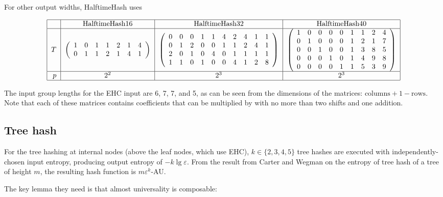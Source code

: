 \documentclass{llncs}
\begin{document}
For other output widths, HalftimeHash uses

\[
\begin{tabular}{|r|c|c|c|}
  \hline  & HalftimeHash16 & HalftimeHash32 & HalftimeHash40 \\
  \hline $T$ &
$\left(
\begin{array}{rrrrrrrrrrrr}
  1 & 0 & 1 & 1 & 2 & 1 & 4\\
  0 & 1 & 1 & 2 & 1 & 4 & 1
\end{array}
\right)$
&
$\left(
\begin{array}{rrrrrrrrrr}
 0 & 0 & 0 & 1 & 1 & 4 & 2 & 4 & 1 & 1 \\
 0 & 1 & 2 & 0 & 0 & 1 & 1 & 2 & 4 & 1 \\
 2 & 0 & 1 & 0 & 4 & 0 & 1 & 1 & 1 & 1 \\
 1 & 1 & 0 & 1 & 0 & 0 & 4 & 1 & 2 & 8
\end{array}
\right)$
&
$\left(
\begin{array}{rrrrrrrrr}
 1 & 0 & 0 & 0 & 0 & 1 & 1 & 2 & 4\\
 0 & 1 & 0 & 0 & 0 & 1 & 2 & 1 & 7\\
 0 & 0 & 1 & 0 & 0 & 1 & 3 & 8 & 5\\
 0 & 0 & 0 & 1 & 0 & 1 & 4 & 9 & 8\\
 0 & 0 & 0 & 0 & 1 & 1 & 5 & 3 & 9
\end{array}
\right)$ \\
\hline $p$ & $2^2$ & $2^3$ & $2^3$ \\
\hline
\end{tabular}
\]

The input group lengths for the EHC input are 6, 7, 7, and 5, as can be seen from the dimensions of the matrices: $\text{columns} + 1 - \text{rows}$.
Note that each of these matrices contains coefficients that can be multiplied by with no more than two shifts and one addition.

\subsection{Tree hash}

For the tree hashing at internal nodes (above the leaf nodes, which use EHC), $k \in \{2, 3, 4, 5\}$ tree hashes are executed with independently-chosen input entropy, producing output entropy of $-k \lg \varepsilon$.
From the result from Carter and Wegman on the entropy of tree hash of a tree of height $m$, the resulting hash function is $m\varepsilon^k$-AU.

The key lemma they need is that almost universality is composable:
\end{document}
